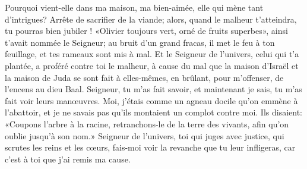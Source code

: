Pourquoi vient-elle dans ma maison, ma bien-aimée,
	elle qui mène tant d’intrigues?
Arrête de sacrifier de la viande;
	alors, quand le malheur t’atteindra, tu pourras bien jubiler !
«Olivier toujours vert, orné de fruits superbes»,
	ainsi t’avait nommée le Seigneur;
	au bruit d’un grand fracas, il met le feu à ton feuillage,
	et tes rameaux sont mis à mal.
Et le Seigneur de l’univers, celui qui t’a plantée,
	a proféré contre toi le malheur,
	à cause du mal que la maison d’Israël et la maison de Juda
		se sont fait à elles-mêmes,
	en brûlant, pour m’offenser, de l’encens au dieu Baal.
Seigneur, tu m’as fait savoir, et maintenant je sais,
	tu m’as fait voir leurs manœuvres.
Moi, j’étais comme un agneau docile qu’on emmène à l’abattoir,
	et je ne savais pas qu’ils montaient un complot contre moi.
Ils disaient: «Coupons l’arbre à la racine,
	retranchons-le de la terre des vivants, afin qu’on oublie jusqu’à son nom.»
Seigneur de l’univers, toi qui juges avec justice,
	qui scrutes les reins et les cœurs,
	fais-moi voir la revanche que tu leur infligeras,
	car c’est à toi que j’ai remis ma cause.
